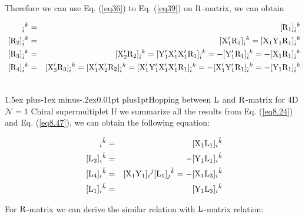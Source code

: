 \documentclass[12pt]{article}
\makeatletter
\def\rL{{\rm L}}
\def\rR{{\rm R}}
\let\bm\relax
\newcommand{\bm}[1]{{\boldsymbol{#1}}}
\def\subsection{\@startsection{subsection}{2}{\z@}
         {1.5ex plus-1ex minus-.2ex}{0.01pt plus1pt}{\sf\slshape}}
\makeatother
\begin{document}
Therefore we can use Eq. (\ref{eq36}) to Eq. (\ref{eq39}) on $\bm\rR$-matrix, we can obtain

\begin{eqnarray}
[{\bm \rR}_1]_{\hat i}{}^{ k}&=&[{\bm \rR}_1]_{\hat i}{}^{k}\nonumber\\
\
[{\bm \rR}_2]_{\hat i}{}^{k}&=&[{\bm{\rm X'_1R_1}}]_{\hat i}{}^{k}=[{\bm{\rm X_1Y_1R_1}}]_{\hat i}{}^{k}\nonumber\\
\
[{\bm{\rR}}_3]_{\hat i}{}^{k}&=&[{\bm{\rm X'_2R_2}}]_{\hat i}{}^{k}
=[{\bm{\rm Y'_1X'_1X'_1R_1}}]_{\hat i}{}^{k}
=-[{\bm{\rm Y'_1R_1}}]_{\hat i}{}^{k}
=-[{\bm{\rm X_1R_1}}]_{\hat i}{}^{k}\nonumber\\
\
[{\bm{\rR}}_4]_{\hat i}{}^{k}&=&[{\bm{\rm X'_3R_3}}]_{\hat i}{}^{k}
=[{\bm{\rm X'_1X'_2R_2}}]_{\hat i}{}^{k}
=[{\bm{\rm X'_1Y'_1X'_1X'_1R_1}}]_{\hat i}{}^{k}
=-[{\bm{\rm X'_1Y'_1R_1}}]_{\hat i}{}^{k}
=-[{\bm{\rm Y_1R_1}}]_{\hat i}{}^{k}\nonumber\\
\
\label{eq8.47}
\end{eqnarray}


\subsection{Hopping between $\bm\rL$ and $\bm\rR$-matrix for 4D $\mathcal{N}=1$ Chiral supermultiplet}
If we summarize all the results from Eq. (\ref{eq8.24}) and Eq. (\ref{eq8.47}), we can obtain the following equation:

\begin{eqnarray}
[{\bm \rL}_2]_{i}{}^{\hat k}&=&[{\bm{\rm X_1L_1}}]_{i}{}^{\hat k}\nonumber\\
\
[{\bm \rL}_3]_{i}{}^{\hat k}&=&-[{\bm{\rm Y_1L_1}}]_{i}{}^{\hat k}\nonumber\\
\
[{\bm \rL}_4]_{i}{}^{\hat k}&=&[{\bm{\rm X_1Y_1}}]_{i}{}^{j}[{\bm{\rm L_1}}]_{j}{}^{\hat k}=-[{\bm{\rm X_1L_3}}]_{i}{}^{\hat k}\nonumber\\
\
[{\bm \rL}_1]_{i}{}^{\hat k}&=&[{\bm{\rm Y_1L_3}}]_{i}{}^{\hat k}
\end{eqnarray}

For $\bm{\rR}$-matrix we can derive the similar relation with $\bm{\rL}$-matrix relation:
\end{document}
